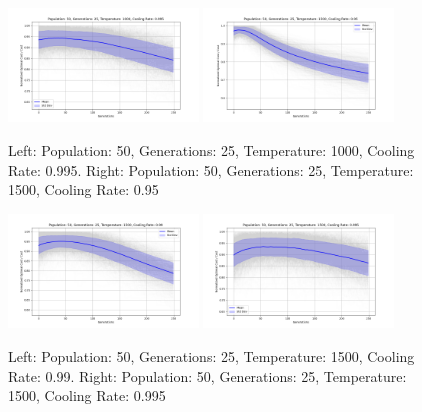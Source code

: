 \documentclass{article}
\begin{document}
    \begin{figure}[H]
        \centering
        \includegraphics[width=0.45\textwidth]{genetic_simulated_annealing_hybrid/appendix/Population_50_Generations_25_Temperature_1000_CoolingRate_0.995.png}
        \includegraphics[width=0.45\textwidth]{genetic_simulated_annealing_hybrid/appendix/Population_50_Generations_25_Temperature_1500_CoolingRate_0.95.png}
        \caption{Left: Population: 50, Generations: 25, Temperature: 1000, Cooling Rate: 0.995. Right: Population: 50, Generations: 25, Temperature: 1500, Cooling Rate: 0.95}
        \label{fig:app_ga_50_25_1000_995_1500_95}
    \end{figure}

    \begin{figure}[H]
        \centering
        \includegraphics[width=0.45\textwidth]{genetic_simulated_annealing_hybrid/appendix/Population_50_Generations_25_Temperature_1500_CoolingRate_0.99.png}
        \includegraphics[width=0.45\textwidth]{genetic_simulated_annealing_hybrid/appendix/Population_50_Generations_25_Temperature_1500_CoolingRate_0.995.png}
        \caption{Left: Population: 50, Generations: 25, Temperature: 1500, Cooling Rate: 0.99. Right: Population: 50, Generations: 25, Temperature: 1500, Cooling Rate: 0.995}
        \label{fig:app_ga_50_25_1500_99_995}
    \end{figure}
\end{document}
